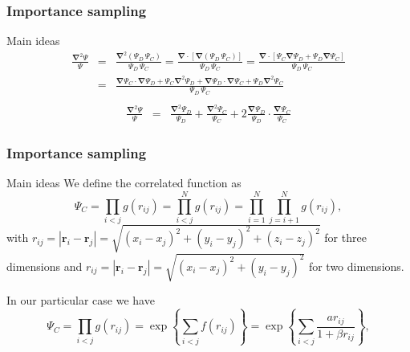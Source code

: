 \documentclass{beamer}
\begin{document}
\begin{frame}
\frametitle{Importance sampling}

\begin{block}{Main ideas }
\begin{eqnarray}
\frac{\mathbf{\nabla}^2 \Psi}{\Psi} & = & \frac{\mathbf{\nabla}^2 ({\Psi_{D} \,  \Psi_C})}{\Psi_{D} \,  \Psi_C} = \frac{\mathbf{\nabla}  \cdot [\mathbf{\nabla}  {(\Psi_{D} \,  \Psi_C)}]}{\Psi_{D} \,  \Psi_C} = \frac{\mathbf{\nabla}  \cdot [ \Psi_C \mathbf{\nabla}  \Psi_{D} + \Psi_{D} \mathbf{\nabla}   \Psi_C]}{\Psi_{D} \,  \Psi_C}\nonumber\\
&  = & \frac{\mathbf{\nabla}   \Psi_C \cdot \mathbf{\nabla}  \Psi_{D} +  \Psi_C \mathbf{\nabla}^2 \Psi_{D} + \mathbf{\nabla}  \Psi_{D} \cdot \mathbf{\nabla}   \Psi_C + \Psi_{D} \mathbf{\nabla}^2  \Psi_C}{\Psi_{D} \,  \Psi_C}\nonumber\\
\end{eqnarray}
\begin{eqnarray}
\frac{\mathbf{\nabla}^2 \Psi}{\Psi}
& = & \frac{\mathbf{\nabla}^2 \Psi_{D}}{\Psi_{D}} + \frac{\mathbf{\nabla}^2  \Psi_C}{ \Psi_C} + 2 \frac{\mathbf{\nabla}  \Psi_{D}}{\Psi_{D}}\cdot\frac{\mathbf{\nabla}   \Psi_C}{ \Psi_C}
\end{eqnarray}

\end{block}
\end{frame}

\begin{frame}
\frametitle{Importance sampling}

\begin{block}{Main ideas }
We define the correlated function as
\[
\Psi_C=\prod_{i< j}g(r_{ij})=\prod_{i< j}^Ng(r_{ij})= \prod_{i=1}^N\prod_{j=i+1}^Ng(r_{ij}),
\]
with 
$r_{ij}=|\mathbf{r}_i-\mathbf{r}_j|=\sqrt{(x_i-x_j)^2+(y_i-y_j)^2+(z_i-z_j)^2}$ for three dimensions and
$r_{ij}=|\mathbf{r}_i-\mathbf{r}_j|=\sqrt{(x_i-x_j)^2+(y_i-y_j)^2}$ for two dimensions.

In our particular case we have
\[
\Psi_C=\prod_{i< j}g(r_{ij})=\exp{\left\{\sum_{i<j}f(r_{ij})\right\}}=
\exp{\left\{\sum_{i<j}\frac{ar_{ij}}{1+\beta r_{ij}}\right\}},
\]

\end{block}
\end{frame}
\end{document}
